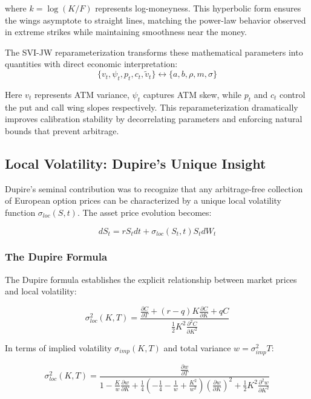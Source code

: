 \documentclass[11pt,a4paper]{article}
\begin{document}
where $k = \log(K/F)$ represents log-moneyness. This hyperbolic form ensures the wings asymptote to straight lines, matching the power-law behavior observed in extreme strikes while maintaining smoothness near the money.

The SVI-JW reparameterization transforms these mathematical parameters into quantities with direct economic interpretation:
\begin{equation}
\{v_t, \psi_t, p_t, c_t, \tilde{v}_t\} \leftrightarrow \{a, b, \rho, m, \sigma\}
\end{equation}

Here $v_t$ represents ATM variance, $\psi_t$ captures ATM skew, while $p_t$ and $c_t$ control the put and call wing slopes respectively. This reparameterization dramatically improves calibration stability by decorrelating parameters and enforcing natural bounds that prevent arbitrage.

\subsection{Local Volatility: Dupire's Unique Insight}

Dupire's seminal contribution \cite{Dupire1994} was to recognize that any arbitrage-free collection of European option prices can be characterized by a unique local volatility function $\sigma_{loc}(S,t)$. The asset price evolution becomes:

\begin{equation}
dS_t = rS_t dt + \sigma_{loc}(S_t,t) S_t dW_t
\end{equation}

\subsubsection{The Dupire Formula}

The Dupire formula establishes the explicit relationship between market prices and local volatility:

\begin{equation}
\sigma_{loc}^2(K,T) = \frac{\frac{\partial C}{\partial T} + (r-q)K\frac{\partial C}{\partial K} + qC}{\frac{1}{2}K^2\frac{\partial^2 C}{\partial K^2}}
\end{equation}

In terms of implied volatility $\sigma_{imp}(K,T)$ and total variance $w = \sigma_{imp}^2 T$:

\begin{equation}
\sigma_{loc}^2(K,T) = \frac{\frac{\partial w}{\partial T}}{1 - \frac{K}{w}\frac{\partial w}{\partial K} + \frac{1}{4}\left(-\frac{1}{4} - \frac{1}{w} + \frac{K^2}{w^2}\right)\left(\frac{\partial w}{\partial K}\right)^2 + \frac{1}{2}K^2\frac{\partial^2 w}{\partial K^2}}
\end{equation}
\end{document}
